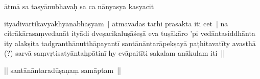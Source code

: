 \documentclass[article,12pt,a4paper]{memoir}%
\newcounter{parCount}
\begin{document}
	  
	  \pstart \leavevmode%
	ātmā sa tasyānubhavaḥ sa ca nānyasya kasyacit 
	{}
	\pend%
      

	  
	  \pstart \leavevmode%
	ityādivārtikavyākhyānabhāṣyam | \label{thakur75-149.18} ātmavādas tarhi prasakta iti cet | na citrākārasaṃvedanāt  ityādi dveṣacikaluṣāśeṣā eva tuṣākāro 'pi vedāntasiddhānta ity alakṣita tadgranthānutthāpayantī santānāntarāpekṣayā paṭhitavatīty avasthā (?) sarvā saṃvṛtisatyāntaḥpātinī hy evāpaitīti sakalam anākulam iti ||
	{}
	\pend%
      

	  
	  \pstart \leavevmode%
	|| santānāntaradūṣaṇaṃ samāptam ||
	{}
	\pend%
      
	    
	    \endnumbering%
	    
	  \backmatter 
\end{document}
